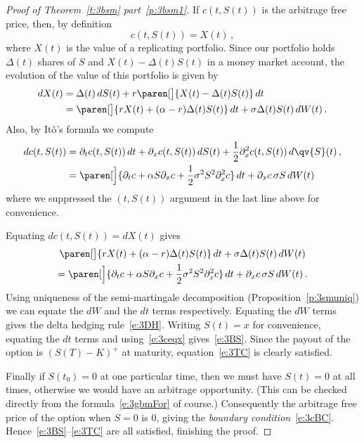 \begin{proof}[Proof of Theorem~\ref{t:3bsm} part~\ref{p:3bsm1}]
  If $c(t, S(t))$ is the arbitrage free price, then, by definition 
  \begin{equation}\label{e:3ceqx}
    c(t, S(t)) = X(t)\,,
  \end{equation}
  where $X(t)$ is the value of a replicating portfolio.
  Since our portfolio holds $\Delta(t)$ shares of $S$ and $X(t) - \Delta(t) S(t)$ in a money market account, the evolution of the value of this portfolio is given by
  \begin{align*}
    dX(t) &= \Delta(t) \, dS(t) + r \paren[\big]{X(t) - \Delta(t) S(t)} \, dt
    \\
      &= \paren[\big]{ r X(t) + (\alpha - r) \Delta(t) S(t) } \, dt
	+ \sigma \Delta(t) S(t) \, dW(t)\,.
  \end{align*}
  Also, by It\^o's formula we compute
  \begin{align*}
    d c(t, S(t))
      &= \partial_t c(t, S(t)) \, dt + \partial_x c(t, S(t)) \, dS(t) + \frac{1}{2} \partial_x^2 c(t, S(t)) \, d\qv{S}(t)\,,
    \\
      &= \paren[\Big]{\partial_t c + \alpha S \partial_x c + \frac{1}{2} \sigma^2 S^2 \partial_x^2 c} \, dt
	+ \partial_x c\, \sigma S \, dW(t)
  \end{align*}
  where we suppressed the $(t, S(t))$ argument in the last line above for convenience.

  Equating $dc(t, S(t)) = dX(t)$ gives
  \begin{multline*}
    \paren[\big]{ r X(t) + (\alpha - r) \Delta(t) S(t) } \, dt
      + \sigma \Delta(t) S(t) \, dW(t)
    \\
      = \paren[\Big]{\partial_t c + \alpha S \partial_x c + \frac{1}{2} \sigma^2 S^2 \partial_x^2 c} \, dt
	+ \partial_x c\, \sigma S \, dW(t)\,.
  \end{multline*}
  Using uniqueness of the semi-martingale decomposition (Proposition~\ref{p:3smuniq}) we can equate the $dW$ and the $dt$ terms respectively.
  Equating the $dW$ terms gives the delta hedging rule~\eqref{e:3DH}.
  Writing $S(t) = x$ for convenience, equating the $dt$ terms and using~\eqref{e:3ceqx} gives~\eqref{e:3BS}.
  Since the payout of the option is $(S(T) - K)^+$ at maturity, equation~\eqref{e:3TC} is clearly satisfied.

  Finally if $S(t_0) = 0$ at one particular time, then we must have $S(t) = 0$ at all times, otherwise we would have an arbitrage opportunity.
  (This can be checked directly from the formula~\eqref{e:3gbmFor} of course.)
  Consequently the arbitrage free price of the option when $S = 0$ is $0$, giving the \emph{boundary condition}~\eqref{e:3cBC}.
  Hence~\eqref{e:3BS}--\eqref{e:3TC} are all satisfied, finishing the proof.
\end{proof}
